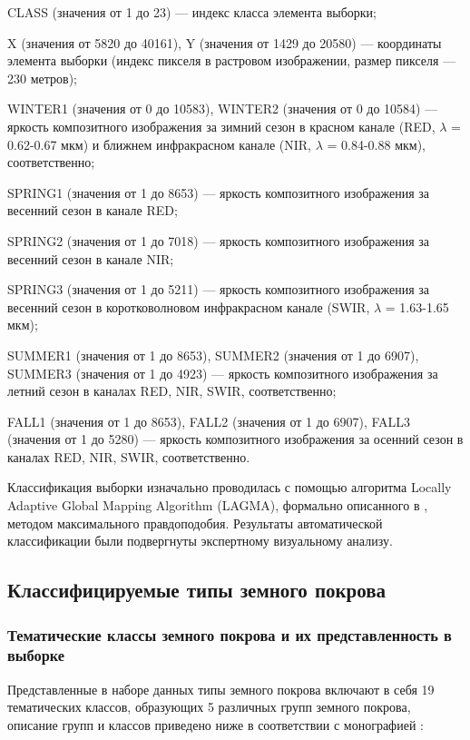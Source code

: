 \documentclass[14pt, a4paper, oneside]{extarticle}
\begin{document}
CLASS (значения от 1 до 23) --- индекс класса элемента выборки;

X (значения от 5820 до 40161), Y (значения от 1429 до 20580) --- координаты элемента выборки (индекс пикселя в растровом изображении, размер пикселя --- 230 метров);

WINTER1 (значения от 0 до 10583), WINTER2 (значения от 0 до 10584) --- яркость композитного изображения за зимний сезон в красном канале (RED, $\lambda$ = 0.62-0.67 мкм) и ближнем инфракрасном канале (NIR, $\lambda$ = 0.84-0.88 мкм), соответственно;

SPRING1 (значения от 1 до 8653) --- яркость композитного изображения за весенний сезон в канале RED;

SPRING2 (значения от 1 до 7018) --- яркость композитного изображения за весенний сезон в канале NIR;

SPRING3 (значения от 1 до 5211) --- яркость композитного изображения за весенний сезон в коротковолновом инфракрасном канале (SWIR, $\lambda$ = 1.63-1.65 мкм);

SUMMER1 (значения от 1 до 8653), SUMMER2 (значения от 1 до 6907), SUMMER3 (значения от 1 до 4923) --- яркость композитного изображения за летний сезон в каналах RED, NIR, SWIR, соответственно;

FALL1 (значения от 1 до 8653), FALL2 (значения от 1 до 6907), FALL3 (значения от 1 до 5280) --- яркость композитного изображения за осенний сезон в каналах RED, NIR, SWIR, соответственно.

Классификация выборки изначально проводилась с помощью алгоритма Locally Adaptive Global Mapping Algorithm (LAGMA), формально описанного в \cite{land-cover-mapping-monograph}, методом максимального правдоподобия. Результаты автоматической классификации были подвергнуты экспертному визуальному анализу.

\subsection{Классифицируемые типы земного покрова}
\subsubsection{Тематические классы земного покрова и их представленность в выборке}
Представленные в наборе данных типы земного покрова включают в себя 19 тематических классов, образующих 5 различных групп земного покрова, описание групп и классов приведено ниже в соответствии с монографией \cite{land-cover-mapping-monograph}:
\end{document}
